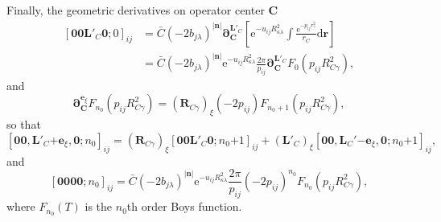 \documentclass[a4paper,11pt,twoside,openright]{book}
\begin{document}
Finally, the geometric derivatives on operator center $\boldsymbol{C}$
\begin{align}
  \left[\boldsymbol{00}\boldsymbol{L}'_{C}\boldsymbol{0};0\right]_{ij}
  &=\bar{C}(-2b_{j\lambda})^{|\boldsymbol{n}|}%
    \boldsymbol{\partial}_{\boldsymbol{C}}^{\boldsymbol{L}'_{C}}%
    \left[\mathrm{e}^{-u_{ij}R_{\kappa\lambda}^2}%
      \int\frac{\mathrm{e}^{-p_{ij}r_{\gamma}^2}}{r_{C}}\mathrm{d}\boldsymbol{r}\right]\\
  &=\bar{C}(-2b_{j\lambda})^{|\boldsymbol{n}|}\mathrm{e}^{-u_{ij}R_{\kappa\lambda}^2}\frac{2\pi}{p_{ij}}%
    \boldsymbol{\partial}_{\boldsymbol{C}}^{\boldsymbol{L}'_{C}}F_{0}\left(p_{ij}R_{C\gamma}^2\right),\nonumber
\end{align}
and
\begin{equation}
  \boldsymbol{\partial}_{\boldsymbol{C}}^{\boldsymbol{e}_{\xi}}F_{n_{0}}\left(p_{ij}R_{C\gamma}^2\right)
  =(\boldsymbol{R}_{C\gamma})_{\xi}(-2p_{ij})F_{n_{0}+1}\left(p_{ij}R_{C\gamma}^2\right),
\end{equation}
so that
\begin{equation}
  \label{eq:r-1-geo-c}
  \left[\boldsymbol{00},\boldsymbol{L}'_{C}\mathrm{+}\boldsymbol{e}_{\xi},\boldsymbol{0};n_{0}\right]_{ij}
  =(\boldsymbol{R}_{C\gamma})_{\xi}\left[\boldsymbol{00}\boldsymbol{L}'_{C}\boldsymbol{0};n_{0}\mathrm{+}1\right]_{ij}%
  +(\boldsymbol{L}'_{C})_{\xi}\left[\boldsymbol{00},\boldsymbol{L}_{C}'\mathrm{-}\boldsymbol{e}_{\xi},%
    \boldsymbol{0};n_{0}\mathrm{+}1\right]_{ij},
\end{equation}
and
\begin{equation}
  \label{eq:r-1-aux-ints}
  \left[\boldsymbol{0000};n_{0}\right]_{ij}
  =\bar{C}(-2b_{j\lambda})^{|\boldsymbol{n}|}\mathrm{e}^{-u_{ij}R_{\kappa\lambda}^2}%
    \frac{2\pi}{p_{ij}}(-2p_{ij})^{n_{0}}F_{n_{0}}\left(p_{ij}R_{C\gamma}^2\right),
\end{equation}
where $F_{n_{0}}(T)$ is the $n_{0}$th order Boys function.
\end{document}
